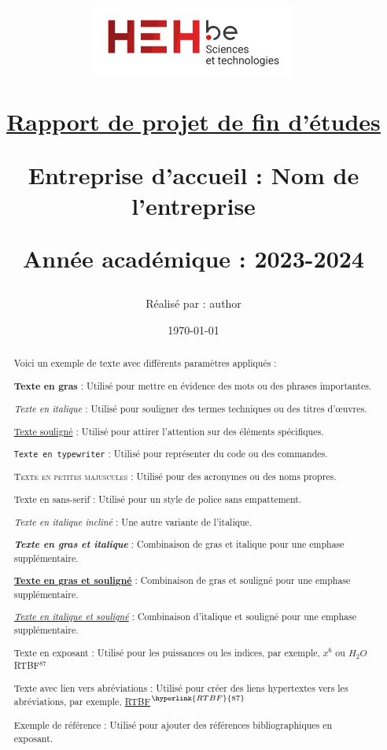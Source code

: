 \documentclass[a4paper, 12pt]{article}
\title{
    \begin{center}
        \includegraphics[width=0.5\textwidth]{img/logo_hehbe_tech.png}
    \end{center}
    \vspace{2cm}
    \begin{center}
        \underline{Rapport de projet de fin d'études}
    \end{center}
    \vspace{2cm}
    \begin{center}
        \fboxrule=0.3mm
        \fbox{
            \parbox{\textwidth}{
                \vspace{1cm}
                \centering
                \textbf{Titre du PFE Lorem ipsum dolor sit amet, consectetur adipiscing elit. Vivamus lacinia odio vitae}
                \vspace{1cm}
            }
        }
    \end{center}
    \vspace{2cm}
    \begin{center}
        \small Entreprise d'accueil : Nom de l'entreprise\\
    \end{center}
    \begin{center}
        \small Année académique : 2023-2024
    \end{center}
    \author{Réalisé par : author}
    \date{\today}

}
\begin{document}
\maketitle
\newpage
\begin{abstract}
    Voici un exemple de texte avec différents paramètres appliqués :
    
    \textbf{Texte en gras} : Utilisé pour mettre en évidence des mots ou des phrases importantes.
    
    \textit{Texte en italique} : Utilisé pour souligner des termes techniques ou des titres d'œuvres.
    
    \underline{Texte souligné} : Utilisé pour attirer l'attention sur des éléments spécifiques.
    
    \texttt{Texte en typewriter} : Utilisé pour représenter du code ou des commandes.
    
    \textsc{Texte en petites majuscules} : Utilisé pour des acronymes ou des noms propres.
    
    \textsf{Texte en sans-serif} : Utilisé pour un style de police sans empattement.
    
    \textsl{Texte en italique incliné} : Une autre variante de l'italique.
    
    \textbf{\textit{Texte en gras et italique}} : Combinaison de gras et italique pour une emphase supplémentaire.
    
    \textbf{\underline{Texte en gras et souligné}} : Combinaison de gras et souligné pour une emphase supplémentaire.
    
    \textit{\underline{Texte en italique et souligné}} : Combinaison d'italique et souligné pour une emphase supplémentaire.
    
    Texte en exposant : Utilisé pour les puissances ou les indices, par exemple, $x^6$ ou $H_2O$ RTBF$^{87}$
    
    Texte avec lien vers abréviations : Utilisé pour créer des liens hypertextes vers les abréviations, par exemple, \hyperlink{RTBF}{RTBF}$^{\hyperlink{RTBF}{87}}$

    Exemple de référence\textsuperscript{\cite{ref1}} : Utilisé pour ajouter des références bibliographiques en exposant.
    
\end{abstract}

\newpage
\tableofcontents

\newpage
\newpage

\newpage
\newpage
\end{document}
